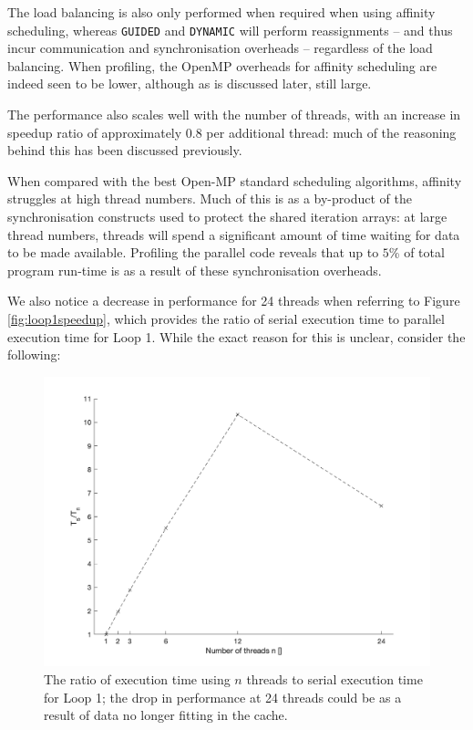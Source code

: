 \documentclass{article} %
\newcommand{\tp}{\texttt}
\begin{document}
The load balancing is also only performed when required when using affinity scheduling, whereas \tp{GUIDED} and \tp{DYNAMIC} will perform reassignments -- and thus incur communication and synchronisation overheads -- regardless of the load balancing.
When profiling, the OpenMP overheads for affinity scheduling are indeed seen to be lower, although as is discussed later, still large.

The performance also scales well with the number of threads, with an increase in speedup ratio of approximately $0.8$ per additional thread: much of the reasoning behind this has been discussed previously.

When compared with the best Open-MP standard scheduling algorithms, affinity struggles at high thread numbers.
Much of this is as a by-product of the synchronisation constructs used to protect the shared iteration arrays: at large thread numbers, threads will spend a significant amount of time waiting for data to be made available.
Profiling the parallel code reveals that up to $5$\% of total program run-time is as a result of these synchronisation overheads.

We also notice a decrease in performance for 24 threads when referring to Figure \ref{fig:loop1speedup}, which provides the ratio of serial execution time to parallel execution time for Loop 1.
While the exact reason for this is unclear, consider the following:

\begin{figure}
    \centering
    \includegraphics[height=.35\textheight]{part2_plots/speedup_affinity_loop1.png}
    \caption{The ratio of execution time using $n$ threads to serial execution time for Loop 1; the drop in performance at 24 threads could be as a result of data no longer fitting in the cache.}
\end{figure}
\end{document}
